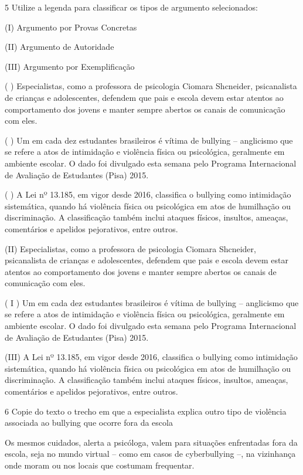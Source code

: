 {\num{5} Utilize a legenda para classificar os tipos de argumento selecionados:

(I) Argumento por Provas Concretas

(II) Argumento de Autoridade

(III) Argumento por Exemplificação

( ) Especialistas, como a professora de psicologia Ciomara Shcneider,
psicanalista de crianças e adolescentes, defendem que pais e escola
devem estar atentos ao comportamento dos jovens e manter sempre abertos
os canais de comunicação com eles.

( ) Um em cada dez estudantes brasileiros é vítima de bullying --
anglicismo que se refere a atos de intimidação e violência física ou
psicológica, geralmente em ambiente escolar. O dado foi divulgado esta
semana pelo Programa Internacional de Avaliação de Estudantes (Pisa)
2015.

( ) A Lei nº 13.185, em vigor desde 2016, classifica o bullying como
intimidação sistemática, quando há violência física ou psicológica em
atos de humilhação ou discriminação. A classificação também inclui
ataques físicos, insultos, ameaças, comentários e apelidos pejorativos,
entre outros.

(II) Especialistas, como a professora de psicologia Ciomara Shcneider,
psicanalista de crianças e adolescentes, defendem que pais e escola
devem estar atentos ao comportamento dos jovens e manter sempre abertos
os canais de comunicação com eles.

( I ) Um em cada dez estudantes brasileiros é vítima de bullying --
anglicismo que se refere a atos de intimidação e violência física ou
psicológica, geralmente em ambiente escolar. O dado foi divulgado esta
semana pelo Programa Internacional de Avaliação de Estudantes (Pisa)
2015.

(III) A Lei nº 13.185, em vigor desde 2016, classifica o bullying como
intimidação sistemática, quando há violência física ou psicológica em
atos de humilhação ou discriminação. A classificação também inclui
ataques físicos, insultos, ameaças, comentários e apelidos pejorativos,
entre outros.

\num{6} Copie do texto o trecho em que a especialista explica outro tipo de violência associada ao bullying que ocorre fora da escola

Os mesmos cuidados, alerta a psicóloga, valem para situações enfrentadas
fora da escola, seja no mundo virtual -- como em casos de cyberbullying
--, na vizinhança onde moram ou nos locais que costumam frequentar.

}
